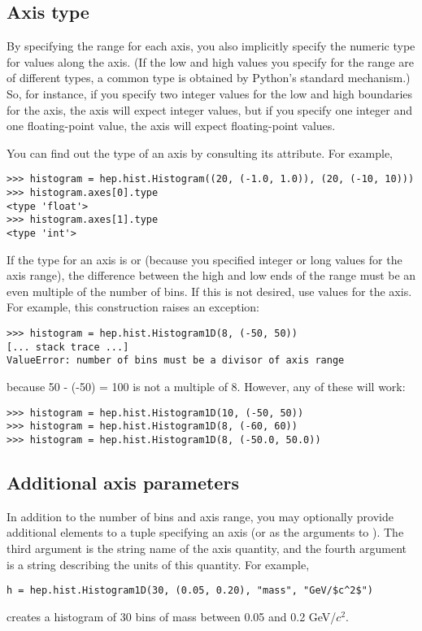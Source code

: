 \subsection{Axis type}

By specifying the range for each axis, you also implicitly specify the
numeric type for values along the axis.  (If the low and high values you
specify for the range are of different types, a common type is obtained
by Python's standard  mechanism.)  So, for instance, if
you specify two integer values for the low and high boundaries for the
axis, the axis will expect integer values, but if you specify one
integer and one floating-point value, the axis will expect
floating-point values.

You can find out the type of an axis by consulting its 
attribute.  For example,
\begin{verbatim}
>>> histogram = hep.hist.Histogram((20, (-1.0, 1.0)), (20, (-10, 10)))
>>> histogram.axes[0].type
<type 'float'>
>>> histogram.axes[1].type
<type 'int'>
\end{verbatim}

If the type for an axis is  or  (because you
specified integer or long values for the axis range), the difference
between the high and low ends of the range must be an even multiple of
the number of bins.  If this is not desired, use  values for
the axis.  For example, this construction raises an exception:
\begin{verbatim}
>>> histogram = hep.hist.Histogram1D(8, (-50, 50))
[... stack trace ...]
ValueError: number of bins must be a divisor of axis range
\end{verbatim}
because 50 - (-50) = 100 is not a multiple of 8.  However, any of these
will work:
\begin{verbatim}
>>> histogram = hep.hist.Histogram1D(10, (-50, 50))
>>> histogram = hep.hist.Histogram1D(8, (-60, 60))
>>> histogram = hep.hist.Histogram1D(8, (-50.0, 50.0))
\end{verbatim}

\subsection{Additional axis parameters}

In addition to the number of bins and axis range, you may optionally
provide additional elements to a tuple specifying an axis (or as the
arguments to ).  The third argument is the string
name of the axis quantity, and the fourth argument is a string
describing the units of this quantity.  For example,
\begin{verbatim}
h = hep.hist.Histogram1D(30, (0.05, 0.20), "mass", "GeV/$c^2$")
\end{verbatim}
creates a histogram of 30 bins of mass between 0.05 and 0.2 GeV/$c^2$.

